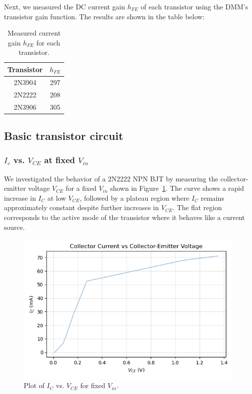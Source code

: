 \documentclass{article}
\begin{document}
Next, we measured the DC current gain $h_{FE}$ of each transistor using the DMM’s 
transistor gain function. The results are shown in the table below:

\begin{table}[H]
    \centering
    \begin{tabular}{|c|c|}
        \hline
        Transistor & $h_{FE}$ \\
        \hline
        2N3904 & 297 \\
        2N2222 & 208 \\
        2N3906 & 305 \\
        \hline
    \end{tabular}
    \caption{Measured current gain \( h_{FE} \) for each transistor.}
\end{table}

\subsection{Basic transistor circuit}

\subsubsection{$I_c$ vs. $V_{CE}$ at fixed $V_{in}$}

We investigated the behavior of a 2N2222 NPN BJT by measuring the collector-emitter
voltage $V_{CE}$ for a fixed $V_{in}$ shown in Figure~\ref{fig:ic_vs_vce}.
The curve shows a rapid increase in $I_C$ at low $V_{CE}$, followed by a
plateau region where $I_C$ remains approximately constant despite further
increases in $V_{CE}$. The flat region corresponds to the active mode of the
transistor where it behaves like a current source.

\begin{figure}[H]
    \centering
    \includegraphics[width=0.75\linewidth]{5.2a.png}
    \caption{Plot of $I_C$ vs. $V_{CE}$ for fixed $V_{in}$.}
    \label{fig:ic_vs_vce}
\end{figure}
\end{document}
